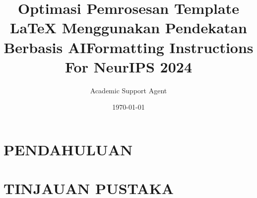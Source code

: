 \documentclass{article}
\title{Optimasi Pemrosesan Template LaTeX Menggunakan Pendekatan Berbasis AI}
\author{Academic Support Agent}
\date{\today}
\begin{document}
\maketitle

\begin{abstract}

\end{abstract}

\chapter{PENDAHULUAN}


\chapter{TINJAUAN PUSTAKA}






\usepackage{neurips_2024}








\usepackage[utf8]{inputenc} %
\usepackage[T1]{fontenc}    %
\usepackage{hyperref}       %
\usepackage{url}            %
\usepackage{booktabs}       %
\usepackage{amsfonts}       %
\usepackage{nicefrac}       %
\usepackage{microtype}      %
\usepackage{xcolor}         %


\title{Formatting Instructions For NeurIPS 2024}


%
\end{document}
